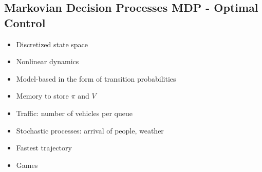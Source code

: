 \begin{mdframed}[backgroundcolor=red!20, frametitlerulewidth=0pt, innertopmargin=-2mm, innerbottommargin=2mm, skipabove=0mm]

\section{Markovian Decision Processes MDP - Optimal Control}
\end{mdframed}
\begin{minipage}{0.33\textwidth}
    \begin{tcolorbox}[colframe=green!50!black, colback=green!5!white, title=Pros, left=0.5mm, right=0.5mm]
    \begin{itemize}[leftmargin=*]
        \item Discretized state space
        \item Nonlinear dynamics
    \end{itemize}
    \end{tcolorbox}
\end{minipage}
\begin{minipage}{0.33\textwidth}
    \begin{tcolorbox}[colframe=red!50!black, colback=red!5!white, title=Cons, left=0.5mm, right=0.5mm]
    \begin{itemize}[leftmargin=*]
        \item Model-based in the form of transition probabilities
        \item Memory to store $\pi$ and $V$
    \end{itemize}
    \end{tcolorbox}
\end{minipage}
\begin{minipage}{0.33\textwidth}
    \begin{tcolorbox}[colframe=gray!50!black, colback=gray!5!white, title=Examples, left=0.5mm, right=0.5mm]
    \begin{itemize}[leftmargin=*]
        \item Traffic: number of vehicles per queue
        \item Stochastic processes: arrival of people, weather
        \item Fastest trajectory
        \item Games
    \end{itemize}
    \end{tcolorbox}
\end{minipage}
